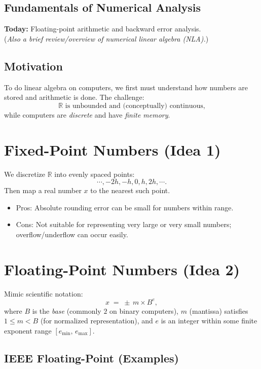 \subsection*{Fundamentals of Numerical Analysis}

\textbf{Today:} Floating-point arithmetic and backward error analysis. \\
(\textit{Also a brief review/overview of numerical linear algebra (NLA).})

\subsection*{Motivation}

To do linear algebra on computers, we first must understand how numbers are stored and arithmetic is done. The challenge:
\[
\mathbb{R} \text{ is unbounded and (conceptually) continuous,}
\]
while computers are \emph{discrete} and have \emph{finite memory}.

\section*{Fixed-Point Numbers (Idea 1)}

We discretize $\mathbb{R}$ into evenly spaced points:
\[
\cdots, -2h, -h, 0, h, 2h, \cdots.
\]
Then map a real number $x$ to the nearest such point.

\begin{itemize}
    \item Pros: Absolute rounding error can be small for numbers within range.
    \item Cons: Not suitable for representing very large or very small numbers; overflow/underflow can occur easily.
\end{itemize}

\section*{Floating-Point Numbers (Idea 2)}

Mimic scientific notation:
\[
x \;=\; \pm \, m \times B^e,
\]
where $B$ is the \emph{base} (commonly $2$ on binary computers), $m$ (mantissa) satisfies $1 \le m < B$ (for normalized representation), and $e$ is an integer within some finite exponent range $[e_{\min},\, e_{\max}]$.

\subsection*{IEEE Floating-Point (Examples)}

